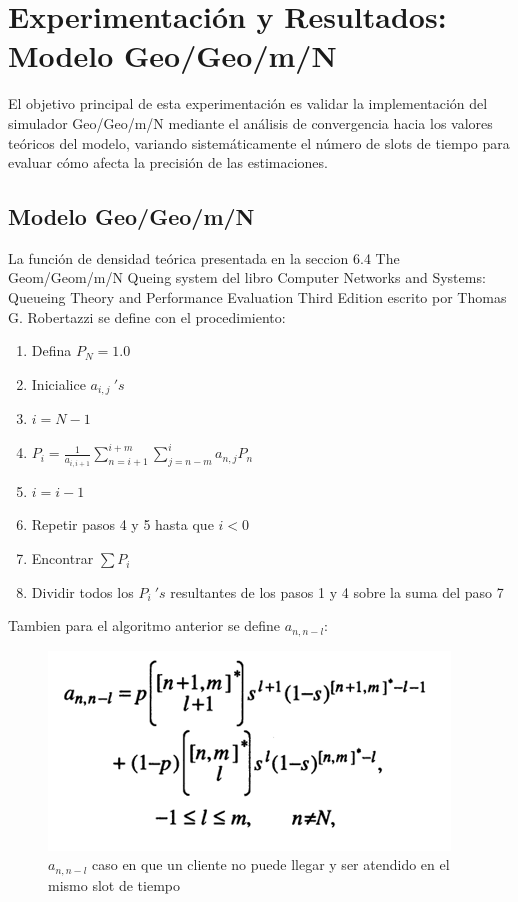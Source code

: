 \documentclass{article}
\begin{document}
\section{Experimentación y Resultados: Modelo Geo/Geo/m/N}\label{sec:exp}

El objetivo principal de esta experimentación es validar la implementación del simulador Geo/Geo/m/N mediante el análisis de convergencia hacia los valores teóricos del modelo, variando sistemáticamente el número de slots de tiempo para evaluar cómo afecta la precisión de las estimaciones.
\subsection{Modelo Geo/Geo/m/N}

La función de densidad teórica presentada en la seccion 6.4 The Geom/Geom/m/N Queing system del libro Computer Networks and Systems: Queueing Theory and Performance Evaluation Third Edition escrito por Thomas G. Robertazzi se define con el procedimiento:

\begin{enumerate}
    \item Defina $P_N = 1.0$
    \item Inicialice $a_{i,j}\ 's$
    \item $i = N-1$
    \item $	P_i=\frac{1}{a_{i,i+1}}\sum_{n=i+1}^{i+m}\sum_{j=n-m}^{i}{a_{n,j}P_n}$
    \item $i=i-1$
    \item Repetir pasos 4 y 5 hasta que $i<0$
    \item Encontrar $\sum {P_i}$
    \item Dividir todos los $P_i\ 's$ resultantes de los pasos 1 y 4 sobre la suma del paso 7
\end{enumerate}

Tambien para el algoritmo anterior se define $a_{n,n-l}$:
\begin{figure}[H]
    \centering
    \includegraphics[width=0.5\linewidth]{images/imageGeoGeoMCalc1.png}
    \caption{$a_{n,n-l}$ caso en que un cliente no puede llegar y ser atendido en el mismo slot de tiempo}
    \label{fig:enter-label}
\end{figure}
\end{document}
